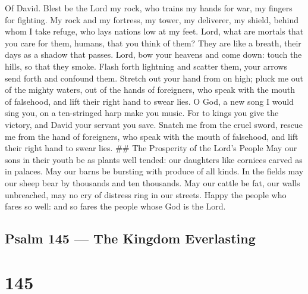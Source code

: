 Of David.  Blest be the Lord my rock, who trains my hands
for war, my fingers for fighting.  My rock and my fortress,
my tower, my deliverer, my shield, behind whom I take refuge, who lays
nations low at my feet.  Lord, what are mortals that you
care for them, humans, that you think of them?  They are
like a breath, their days as a shadow that passes.  Lord,
bow your heavens and come down: touch the hills, so that they smoke.
 Flash forth lightning and scatter them, your arrows send
forth and confound them.  Stretch out your hand from on
high; pluck me out of the mighty waters, out of the hands of foreigners,
 who speak with the mouth of falsehood, and lift their right
hand to swear lies.  O God, a new song I would sing you, on
a ten-stringed harp make you music.  For to kings you give
the victory, and David your servant you save.  Snatch me
from the cruel sword, rescue me from the hand of foreigners, who speak
with the mouth of falsehood, and lift their right hand to swear lies.
\#\# The Prosperity of the Lord's People  May our sons in
their youth be as plants well tended: our daughters like cornices carved
as in palaces.  May our barns be bursting with produce of
all kinds. In the fields may our sheep bear by thousands and ten
thousands.  May our cattle be fat, our walls unbreached,
may no cry of distress ring in our streets.  Happy the
people who fares so well: and so fares the people whose God is the Lord.

\hypertarget{psalm-145-the-kingdom-everlasting}{%
\subsection{Psalm 145 --- The Kingdom
Everlasting}\label{psalm-145-the-kingdom-everlasting}}

\hypertarget{section-144}{%
\section{145}\label{section-144}}

